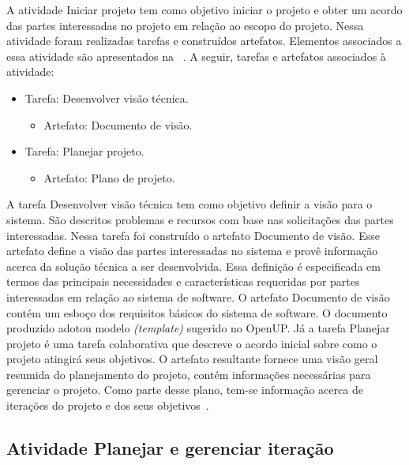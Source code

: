 A atividade Iniciar projeto tem como objetivo iniciar o projeto e obter um acordo das partes interessadas no projeto em relação ao escopo do projeto. 
Nessa atividade foram realizadas tarefas e construídos artefatos. Elementos associados a essa atividade são apresentados na ~. A seguir, tarefas e artefatos associados à atividade:

\begin{itemize}
    \item Tarefa: Desenvolver visão técnica.
        \begin{itemize}
            \item Artefato: Documento de visão.
        \end{itemize}
    \item Tarefa: Planejar projeto.
    \begin{itemize}
            \item Artefato: Plano de projeto.
        \end{itemize}
\end{itemize}


%

A tarefa Desenvolver visão técnica tem como objetivo definir a visão para o sistema. São descritos problemas e recursos com base nas solicitações das partes interessadas. 
Nessa tarefa foi construído o artefato Documento de visão. Esse artefato define a visão das partes interessadas no sistema e provê informação acerca da solução técnica a ser desenvolvida. Essa definição é especificada em termos das principais necessidades e características requeridas por partes interessadas em relação ao sistema de software. O artefato Documento de visão contém um esboço dos requisitos básicos do sistema de software. O documento produzido adotou modelo \emph{(template)} sugerido no OpenUP.
Já a tarefa Planejar projeto é uma tarefa colaborativa que descreve o acordo inicial sobre como o projeto atingirá seus objetivos. O artefato resultante  fornece uma visão geral resumida do planejamento do projeto, contém  informações necessárias para gerenciar o projeto. Como parte desse plano, tem-se informação acerca de iterações do projeto e dos seus objetivos~\cite{openup}.

\subsection{Atividade Planejar e gerenciar iteração}

